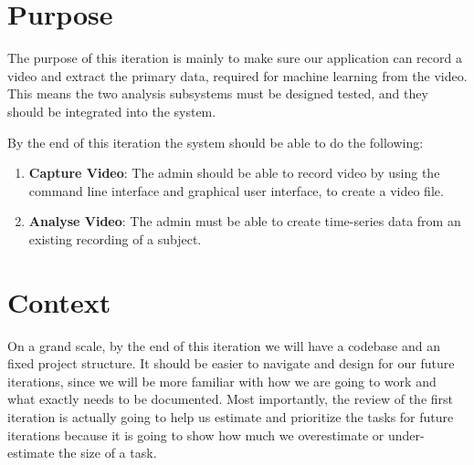 \documentclass[12pt,a4paper,man]{report}
\begin{document}
\section{Purpose}
\label{sec:orgfa5924a}
The purpose of this iteration is mainly to make sure our application can record a video and extract the primary data, required for machine learning from the video. This means the two analysis subsystems must be designed tested, and they should be integrated into the system.

By the end of this iteration the system should be able to do the following:
\begin{enumerate}
\item \textbf{Capture Video}: The admin should be able to record video by using the command line interface and graphical user interface, to create a video file.
\item \textbf{Analyse Video}: The admin must be able to create time-series data from an existing recording of a subject.
\end{enumerate}


\section{Context}
\label{sec:orgbe98b69}
On a grand scale, by the end of this iteration we will have a codebase and an fixed project structure. It should be easier to navigate and design for our future iterations, since we will be more familiar with how we are going to work and what exactly needs to be documented. Most importantly, the review of the first iteration is actually going to help us estimate and prioritize the tasks for future iterations because it is going to show how much we overestimate or under-estimate the size of a task.
\end{document}
